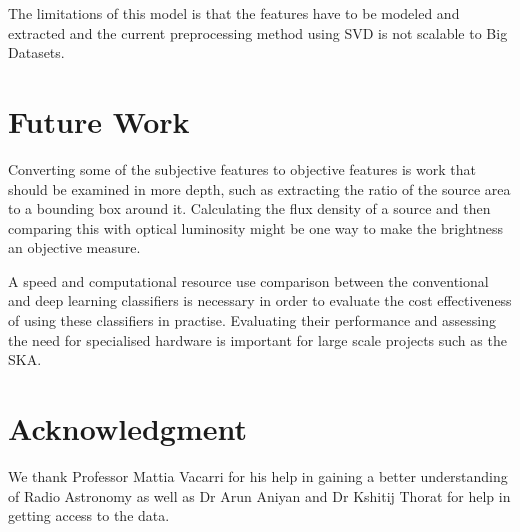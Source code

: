 \documentclass[conference]{IEEEtran}
\begin{document}
The limitations of this model is that the features have to be modeled and extracted and the current preprocessing method using SVD is not scalable to Big Datasets.

\section{Future Work}

Converting some of the subjective features to objective features is work that should be examined in more depth, such as extracting the ratio of the source area to a bounding box around it. Calculating the flux density of a source and then comparing this with optical luminosity might be one way to make the brightness an objective measure.

A speed and computational resource use comparison between the conventional and deep learning classifiers is necessary in order to evaluate the cost effectiveness of using these classifiers in practise. Evaluating their performance and assessing the need for specialised hardware is important for large scale projects such as the SKA.

\section*{Acknowledgment}

We thank Professor Mattia Vacarri for his help in gaining a better understanding of Radio Astronomy as well as Dr Arun Aniyan and Dr Kshitij Thorat for help in getting access to the data.




\end{document}
